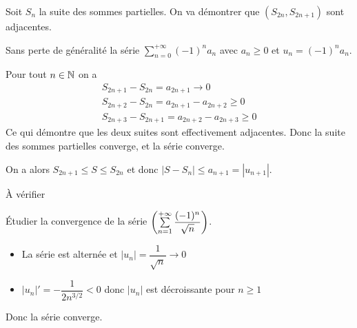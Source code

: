 \documentclass[a4paper, 12pt]{article}
\begin{document}
\begin{demonstration}
    Soit $S_n$ la suite des sommes partielles. On va démontrer que $(S_{2n}, S_{2n+1})$ sont adjacentes.

    Sans perte de généralité la série $\sum\limits_{n=0}^{+\infty} (-1)^n a_n$ avec $a_n \geq 0$ et $u_n = (-1)^n a_n$.

    Pour tout $n \in \N$ on a
    \begin{align*}  
        S_{2n + 1} - S_{2n} = a_{2n+1} \rightarrow 0\\
        S_{2n + 2} - S_{2n} = a_{2n+1} - a_{2n+2} \geq 0\\
        S_{2n + 3} - S_{2n+1} = a_{2n+2} - a_{2n+3} \geq 0
    \end{align*}
    Ce qui démontre que les deux suites sont effectivement adjacentes.
    Donc la suite des sommes partielles converge, et la série converge.

    On a alors $S_{2n + 1} \leq S \leq S_{2n}$ et donc $|S - S_n| \leq a_{n+1} = |u_{n+1}|$.
    \begin{hotwarn}
        À vérifier
    \end{hotwarn}
\end{demonstration}

\begin{exemple}
    Étudier la convergence de la série $\seriedef{\dfrac{(-1)^n}{\sqrt{n}}}{1}$.
    \begin{itemize}
        \item La série est alternée et $|u_n| = \dfrac{1}{\sqrt{n}} \rightarrow 0$
        \item $|u_n|' = -\dfrac{1}{2n^{3/2}} < 0$ donc $|u_n|$ est décroissante pour $n \geq 1$
    \end{itemize}
    Donc la série converge.
\end{exemple}
\end{document}
